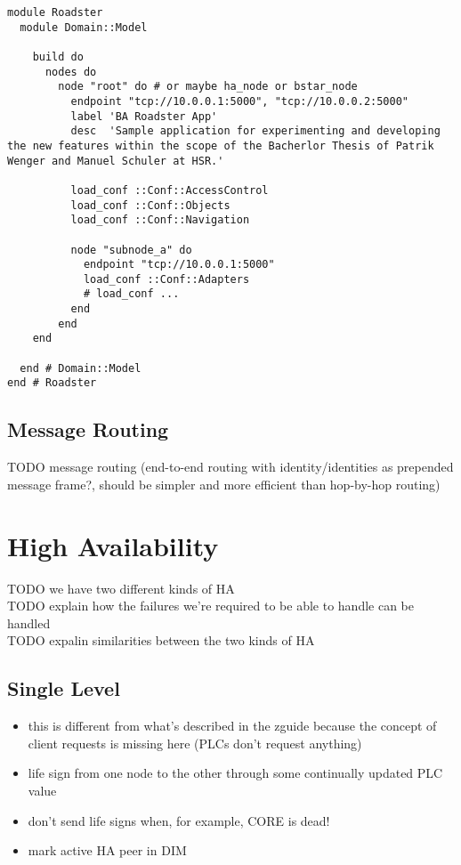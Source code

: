 \begin{lstlisting}[style=customruby]
module Roadster
  module Domain::Model

    build do
      nodes do
        node "root" do # or maybe ha_node or bstar_node
          endpoint "tcp://10.0.0.1:5000", "tcp://10.0.0.2:5000"
          label 'BA Roadster App'
          desc  'Sample application for experimenting and developing the new features within the scope of the Bacherlor Thesis of Patrik Wenger and Manuel Schuler at HSR.'

          load_conf ::Conf::AccessControl
          load_conf ::Conf::Objects
          load_conf ::Conf::Navigation

          node "subnode_a" do
            endpoint "tcp://10.0.0.1:5000"
            load_conf ::Conf::Adapters
            # load_conf ...
          end
        end
    end

  end # Domain::Model
end # Roadster
\end{lstlisting}


\subsection{Message Routing}
TODO message routing (end-to-end routing with identity/identities as prepended message frame?, should be simpler and more efficient than hop-by-hop routing)\\

\section{High Availability}\label{sec:meth:ha}
TODO we have two different kinds of HA\\
TODO explain how the failures we're required to be able to handle can be handled\\
TODO expalin similarities between the two kinds of HA\\

\subsection{Single Level}
\begin{itemize}
	\item this is different from what's described in the zguide because the concept of client requests is missing here (PLCs don't request anything)
	\item life sign from one node to the other through some continually updated PLC value
	\item don't send life signs when, for example, CORE is dead!
	\item mark active HA peer in DIM
\end{itemize}

